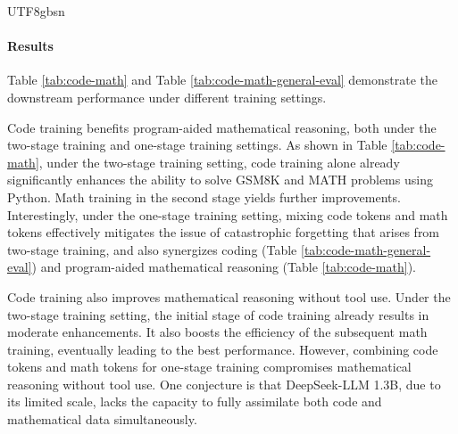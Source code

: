 \documentclass[11pt, a4paper, logo, copyright, nonumbering]{deepseek}
\begin{document}
\begin{CJK*}{UTF8}{gbsn}
\paragraph{Results}
Table \ref{tab:code-math} and Table \ref{tab:code-math-general-eval} demonstrate the downstream performance under different training settings.

Code training benefits program-aided mathematical reasoning, both under the two-stage training and one-stage training settings.
As shown in Table \ref{tab:code-math}, under the two-stage training setting, code training alone already significantly enhances the ability to solve GSM8K and MATH problems using Python.
Math training in the second stage yields further improvements.
Interestingly, under the one-stage training setting, mixing code tokens and math tokens effectively mitigates the issue of catastrophic forgetting that arises from two-stage training, and also synergizes coding (Table \ref{tab:code-math-general-eval}) and program-aided mathematical reasoning (Table \ref{tab:code-math}).

Code training also improves mathematical reasoning without tool use.
Under the two-stage training setting, the initial stage of code training already results in moderate enhancements.
It also boosts the efficiency of the subsequent math training, eventually leading to the best performance.
However, combining code tokens and math tokens for one-stage training compromises mathematical reasoning without tool use.
One conjecture is that DeepSeek-LLM 1.3B, due to its limited scale, lacks the capacity to fully assimilate both code and mathematical data simultaneously.


\end{CJK*}
\end{document}
